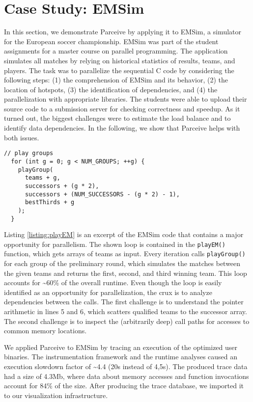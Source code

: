 \section{Case Study: EMSim}
\label{sec:case_study}
In this section, we demonstrate Parceive by applying it to EMSim, a simulator
for the European soccer championship. EMSim was part of the student assignments
for a master course on parallel programming. The application simulates all
matches by relying on historical statistics of results, teams, and players. The
task was to parallelize the sequential C code by considering the following
steps: (1) the comprehension of EMSim and its behavior, (2) the location of
hotspots, (3) the identification of dependencies, and (4) the parallelization
with appropriate libraries. The students were able to upload their source code
to a submission server for checking correctness and speedup. As it turned out,
the biggest challenges were to estimate the load balance and to identify data
dependencies. In the following, we show that Parceive helps with both issues.

\begin{lstlisting}[caption=A major region for loop-parallelism in the
EMSim code, label=listing:playEM]
  // play groups
  for (int g = 0; g < NUM_GROUPS; ++g) {
    playGroup(
      teams + g,
      successors + (g * 2),
      successors + (NUM_SUCCESSORS - (g * 2) - 1),
      bestThirds + g
    );
  }
\end{lstlisting}

Listing \ref{listing:playEM} is an excerpt of the EMSim code that contains a
major opportunity for parallelism. The shown loop is contained in the
\texttt{playEM()} function, which gets arrays of teams as input. Every
iteration calls \texttt{playGroup()} for each group of the preliminary round,
which simulates the matches between the given teams and returns the first,
second, and third winning team. This loop accounts for \textasciitilde60\% of
the overall runtime. Even though the loop is easily identified as an
opportunity for parallelization, the crux is to analyze dependencies between
the calls. The first challenge is to understand the pointer arithmetic in lines
5 and 6, which scatters qualified teams to the successor array. The second
challenge is to inspect the (arbitrarily deep) call paths for accesses to
common memory locations.

We applied Parceive to EMSim by tracing an execution of the optimized user
binaries. The instrumentation framework and the runtime analyses caused an
execution slowdown factor of \textasciitilde 4.4 (20s instead of 4,5s). The
produced trace data had a size of 4.3Mb, where data about memory accesses and
function invocations account for 84\% of the size. After producing the trace
database, we imported it to our visualization infrastructure.

